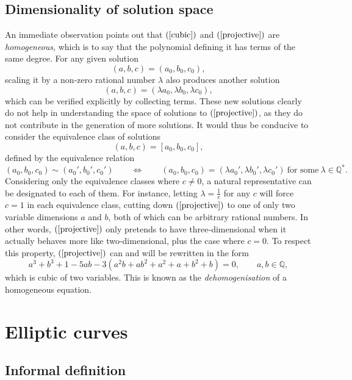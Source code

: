 \documentclass{article}
\newcommand{\rb}[1]{\left( #1 \right)}
\renewcommand{\sb}[1]{\left[ #1 \right]}
\newcommand{\Q}{\mathbb{Q}}
\begin{document}
\subsection{Dimensionality of solution space}

An immediate observation points out that $ \rb{\ref{cubic}} $ and $ \rb{\ref{projective}} $ are \emph{homogeneous}, which is to say that the polynomial defining it has terms of the same degree. For any given solution
$$ \rb{a, b, c} = \rb{a_0, b_0, c_0}, $$
scaling it by a non-zero rational number $ \lambda $ also produces another solution
$$ \rb{a, b, c} = \rb{\lambda a_0, \lambda b_0, \lambda c_0}, $$
which can be verified explicitly by collecting terms. These new solutions clearly do not help in understanding the space of solutions to $ \rb{\ref{projective}} $, as they do not contribute in the generation of more solutions. It would thus be conducive to consider the equivalence class of solutions
$$ \rb{a, b, c} = \sb{a_0, b_0, c_0}, $$
defined by the equivalence relation
$$ \rb{a_0, b_0, c_0} \sim \rb{a_0', b_0', c_0'} \qquad \iff \qquad \rb{a_0, b_0, c_0} = \rb{\lambda a_0', \lambda b_0', \lambda c_0'} \ \text{for some} \ \lambda \in \Q^*. $$
Considering only the equivalence classes where $ c \ne 0 $, a natural representative can be designated to each of them. For instance, letting $ \lambda = \tfrac{1}{c} $ for any $ c $ will force $ c = 1 $ in each equivalence class, cutting down $ \rb{\ref{projective}} $ to one of only two variable dimensions $ a $ and $ b $, both of which can be arbitrary rational numbers. In other words, $ \rb{\ref{projective}} $ only pretends to have three-dimensional when it actually behaves more like two-dimensional, plus the case where $ c = 0 $. To respect this property, $ \rb{\ref{projective}} $ can and will be rewritten in the form
\begin{equation}
\label{affine}
a^3 + b^3 + 1 - 5ab - 3\rb{a^2b + ab^2 + a^2 + a + b^2 + b} = 0, \qquad a, b \in \Q,
\end{equation}
which is cubic of two variables. This is known as the \emph{dehomogenisation} of a homogeneous equation.

\section{Elliptic curves}

\subsection{Informal definition}
\end{document}
